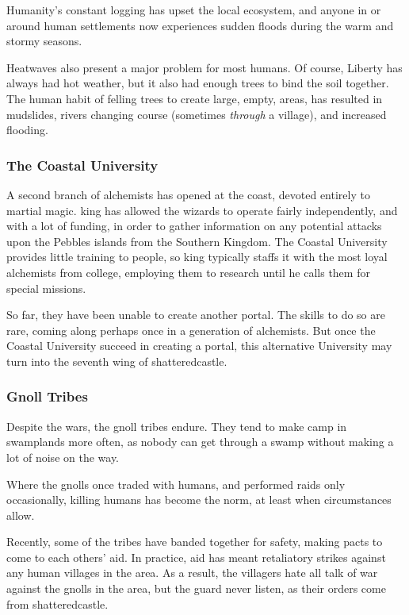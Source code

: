 \begin{multicols}{2}
Humanity's constant logging has upset the local ecosystem, and anyone in or around human settlements now experiences sudden floods during the warm and stormy seasons.

Heatwaves also present a major problem for most humans.
Of course, Liberty has always had hot weather, but it also had enough trees to bind the soil together.
The human habit of felling trees to create large, empty, areas, has resulted in mudslides, rivers changing course (sometimes \emph{through} a village), and increased flooding.

\subsubsection{The Coastal University}

A second branch of \gls{alchemists} has opened at the coast, devoted entirely to martial magic.
\Gls{king} has allowed the wizards to operate fairly independently, and with a lot of funding, in order to gather information on any potential attacks upon the Pebbles islands from the Southern Kingdom.
The Coastal University provides little training to people, so \gls{king} typically staffs it with the most loyal alchemists from \gls{college}, employing them to research until he calls them for special missions.

So far, they have been unable to create another portal.
The skills to do so are rare, coming along perhaps once in a generation of alchemists.
But once the Coastal University succeed in creating a portal, this alternative University may turn into the seventh wing of \gls{shatteredcastle}.

\subsubsection{Gnoll Tribes}

Despite the wars, the gnoll tribes endure.
They tend to make camp in swamplands more often, as nobody can get through a swamp without making a lot of noise on the way.

Where the gnolls once traded with humans, and performed raids only occasionally, killing humans has become the norm, at least when circumstances allow.

Recently, some of the tribes have banded together for safety, making pacts to come to each others' aid.
In practice, aid has meant retaliatory strikes against any human villages in the area.
As a result, the villagers hate all talk of war against the gnolls in the area, but the \gls{guard} never listen, as their orders come from \gls{shatteredcastle}.


\end{multicols}
